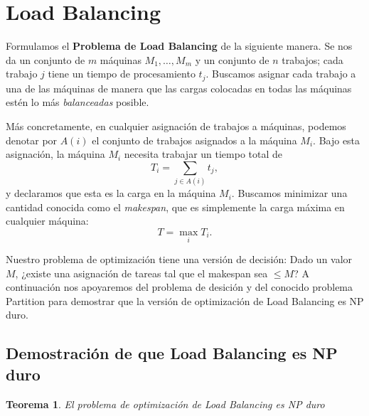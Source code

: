 \documentclass{report}
\newtheorem{theorem}{Teorema} %
\begin{document}
	\section{Load Balancing}
	Formulamos el \textbf{Problema de Load Balancing} de la siguiente manera. Se nos da un conjunto de \( m \) máquinas \( M_1, \dots, M_m \) y un conjunto de \( n \) trabajos; cada trabajo \( j \) tiene un tiempo de procesamiento \( t_j \). Buscamos asignar cada trabajo a una de las máquinas de manera que las cargas colocadas en todas las máquinas estén lo más \textit{balanceadas} posible.
	
	Más concretamente, en cualquier asignación de trabajos a máquinas, podemos denotar por \( A(i) \) el conjunto de trabajos asignados a la máquina \( M_i \). Bajo esta asignación, la máquina \( M_i \) necesita trabajar un tiempo total de
	\[
	T_i = \sum_{j \in A(i)} t_j,
	\]
	y declaramos que esta es la carga en la máquina \( M_i \). Buscamos minimizar una cantidad conocida como el \textit{makespan}, que es simplemente la carga máxima en cualquier máquina:
	\[
	T = \max_i T_i.
	\]
	


	Nuestro problema de optimización tiene una versión de decisión: Dado un valor $ M $, ¿existe una asignación de tareas tal que el makespan sea $ \leq M $?
	A continuación nos apoyaremos del problema de desición y del conocido problema Partition para demostrar que la versión de optimización de Load Balancing es NP duro.
	
	\subsection{Demostración de que Load Balancing es NP duro}
	
	\begin{theorem}
		El problema de optimización de Load Balancing es NP duro
	\end{theorem}
	
\end{document}
